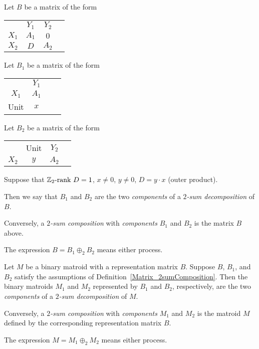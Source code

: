 \begin{definition}
  \label{Matrix_2sumComposition}
  \leanok
  Let $B$ be a matrix of the form
  \begin{tabular}{cccc}
                                 & $Y_{1}$                      & $Y_{2}$                      \\ \cline{2-3}
    \multicolumn{1}{c|}{$X_{1}$} & \multicolumn{1}{c|}{$A_{1}$} & \multicolumn{1}{c|}{    $0$} \\ \cline{2-3}
    \multicolumn{1}{c|}{$X_{2}$} & \multicolumn{1}{c|}{    $D$} & \multicolumn{1}{c|}{$A_{2}$} \\ \cline{2-3}
  \end{tabular}
  Let $B_{1}$ be a matrix of the form
  \begin{tabular}{cccc}
                                 & $Y_{1}$ \\ \cline{2-3}
    \multicolumn{1}{c|}{$X_{1}$} & \multicolumn{1}{c|}{$A_{1}$} \\ \cline{2-3}
    \multicolumn{1}{c|}{   Unit} & \multicolumn{1}{c|}{    $x$} \\ \cline{2-3}
  \end{tabular}
  Let $B_{2}$ be a matrix of the form
  \begin{tabular}{cccc}
                                 &                     Unit & $Y_{2}$ \\ \cline{2-3}
    \multicolumn{1}{c|}{$X_{2}$} & \multicolumn{1}{c|}{$y$} & \multicolumn{1}{c|}{$A_{2}$} \\ \cline{2-3}
  \end{tabular}
  Suppose that $\mathbb{Z}_2 \text{-rank } D = 1$, $x \neq 0$, $y \neq 0$, $D = y \cdot x$ (outer product).

  Then we say that $B_{1}$ and $B_{2}$ are the two \emph{components} of a \emph{$2$-sum decomposition} of $B$.

  Conversely, a \emph{$2$-sum composition} with \emph{components} $B_{1}$ and $B_{2}$ is the matrix $B$ above.

  The expression $B = B_{1} \oplus_{2} B_{2}$ means either process.
\end{definition}

\begin{definition}
  \label{BinaryMatroid.Is2sumOf}
  \leanok
  Let $M$ be a binary matroid with a representation matrix $B$.
  Suppose $B$, $B_{1}$, and $B_{2}$ satisfy the assumptions of Definition~\ref{Matrix_2sumComposition}.
  Then the binary matroids $M_{1}$ and $M_{2}$ represented by $B_{1}$ and $B_{2}$, respectively, are the two \emph{components} of a \emph{$2$-sum decomposition} of $M$.

  Conversely, a \emph{$2$-sum composition} with \emph{components} $M_{1}$ and $M_{2}$ is the matroid $M$ defined by the corresponding representation matrix $B$.

  The expression $M = M_{1} \oplus_{2} M_{2}$ means either process.
\end{definition}

